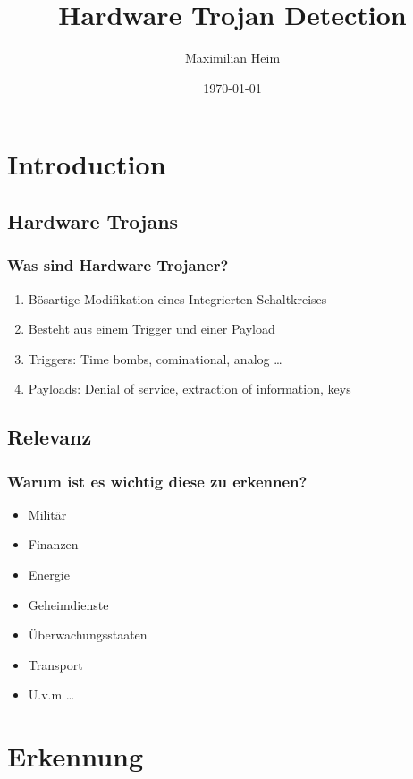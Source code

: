 \documentclass[11pt]{beamer}
\author{Maximilian Heim}
\title{Hardware Trojan Detection}
\institute{University Albstadt-Sigmaringen}
\date{\today}
\begin{document}
\begin{frame}
\titlepage
\end{frame}

\begin{frame}
\tableofcontents
\end{frame}

\section{Introduction}
\subsection{Hardware Trojans}
\begin{frame}
    \frametitle{Was sind Hardware Trojaner?}
    \begin{enumerate}
    \item Bösartige Modifikation eines Integrierten Schaltkreises
    \item Besteht aus einem Trigger und einer Payload
    \item Triggers: Time bombs, cominational, analog \dots
    \item Payloads: Denial of service, extraction of information, keys
    \end{enumerate}
\end{frame}
\subsection{Relevanz}
\begin{frame}
    \frametitle{Warum ist es wichtig diese zu erkennen?}
    \begin{itemize}
    \item Militär
    \item Finanzen
    \item Energie
    \item Geheimdienste
    \item Überwachungsstaaten
    \item Transport
    \item U.v.m \ldots
    \end{itemize}

\end{frame}


\section{Erkennung}
\end{document}

